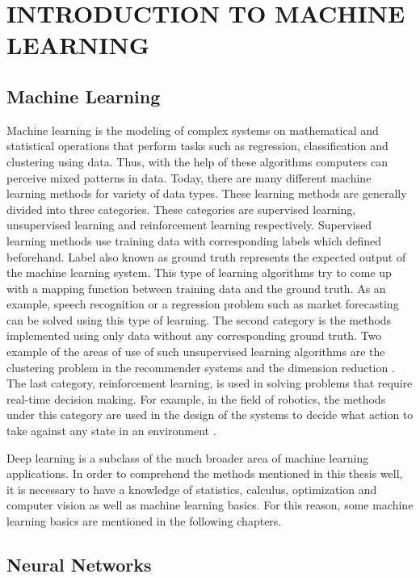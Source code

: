 \chapter{INTRODUCTION TO MACHINE LEARNING}\label{intro_to_ml}

\section{Machine Learning}

Machine learning is the modeling of complex systems on mathematical and statistical operations that perform tasks such as regression, classification and clustering using data. Thus, with the help of these algorithms computers can perceive mixed patterns in data. Today, there are many different machine learning methods for variety of data types. These learning methods are generally divided into three categories. These categories are supervised learning, unsupervised learning and reinforcement learning respectively. Supervised learning methods use training data with corresponding labels which defined beforehand. Label also known as ground truth represents the expected output of the machine learning system. This type of learning algorithms try to come up with a mapping function between training data and the ground truth. As an example, speech recognition \cite{speech_recognition} or a regression problem such as market forecasting \cite{market} can be solved using this type of learning. The second category is the methods implemented using only data without any corresponding ground truth. Two example of the areas of use of such unsupervised learning algorithms are the clustering problem in the recommender systems \cite{recommender_systems} and the dimension reduction \cite{pca}. The last category, reinforcement learning, is used in solving problems that require real-time decision making. For example, in the field of robotics, the methods under this category are used in the design of the systems to decide what action to take against any state in an environment \cite{robotics}.

Deep learning is a subclass of the much broader area of machine learning applications. In order to comprehend the methods mentioned in this thesis well, it is necessary to have a knowledge of statistics, calculus, optimization and computer vision as well as machine learning basics. For this reason, some machine learning basics are mentioned in the following chapters.

\section{Neural Networks}

